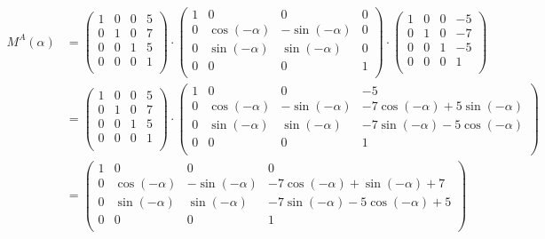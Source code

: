 \documentclass[a4paper,10pt,DIV=14]{scrartcl}
\begin{document}
\begin{align*}
M^A(\alpha) & = \begin{pmatrix}
					1 & 0 & 0 & 5 \\
					0 & 1 & 0 & 7 \\
					0 & 0 & 1 & 5 \\
					0 & 0 & 0 & 1 \\
				\end{pmatrix} \cdot
				\begin{pmatrix}
					1 & 0             & 0              & 0 \\
					0 & \cos(-\alpha) & -\sin(-\alpha) & 0 \\
					0 & \sin(-\alpha) & \sin(-\alpha)  & 0 \\
					0 & 0             & 0              & 1 \\
				\end{pmatrix} \cdot
				\begin{pmatrix}
					1 & 0 & 0 & -5 \\
					0 & 1 & 0 & -7 \\
					0 & 0 & 1 & -5 \\
					0 & 0 & 0 & 1  \\
				\end{pmatrix} \\
			& = \begin{pmatrix}
					1 & 0 & 0 & 5 \\
					0 & 1 & 0 & 7 \\
					0 & 0 & 1 & 5 \\
					0 & 0 & 0 & 1 \\
				\end{pmatrix} \cdot
				\begin{pmatrix}
					1 & 0             & 0              & -5                               \\
					0 & \cos(-\alpha) & -\sin(-\alpha) & -7\cos(-\alpha) + 5\sin(-\alpha)  \\
					0 & \sin(-\alpha) & \sin(-\alpha)  & -7\sin(-\alpha) - 5\cos(-\alpha) \\
					0 & 0             & 0              & 1                                \\
				\end{pmatrix} \\
			& = \begin{pmatrix}
					1 & 0             & 0              & 0                                    \\
					0 & \cos(-\alpha) & -\sin(-\alpha) & -7\cos(-\alpha) + \sin(-\alpha) + 7  \\
					0 & \sin(-\alpha) & \sin(-\alpha)  & -7\sin(-\alpha) - 5\cos(-\alpha) + 5 \\
					0 & 0             & 0              & 1                                    \\
				\end{pmatrix}
\end{align*}
\end{document}
